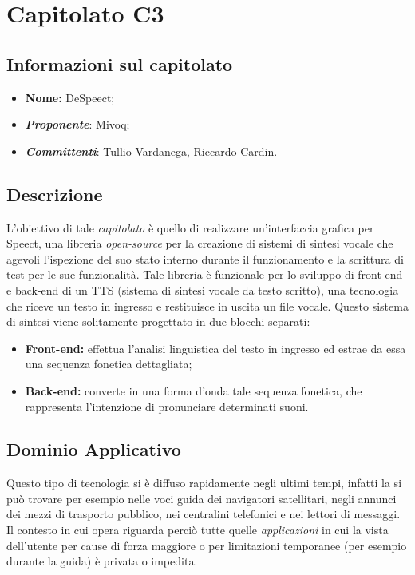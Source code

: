 \section{Capitolato C3}
\subsection{Informazioni sul capitolato}
	\begin{itemize}
		\item \textbf{Nome:}
		DeSpeect;
		\item \textbf{\textit{Proponente}}:
		Mivoq;
		\item \textbf{\textit{Committenti}}:
		Tullio Vardanega, Riccardo Cardin.
	\end{itemize}

\subsection{Descrizione}
	L'obiettivo di tale \textit{capitolato} è quello di realizzare un'interfaccia grafica per Speect, una libreria \textit{open-source} per la creazione di sistemi di sintesi vocale che agevoli l’ispezione del suo stato interno durante il funzionamento e la scrittura di test per le sue funzionalità.
	\newline \newline Tale libreria è funzionale per lo sviluppo di front-end e back-end di un TTS (sistema di sintesi vocale da testo scritto), una tecnologia che riceve un testo in ingresso e restituisce in uscita un file vocale. Questo sistema di sintesi viene solitamente progettato in due blocchi separati:
	\begin{itemize}
		\item \textbf{Front-end:}
		effettua l'analisi linguistica del testo in ingresso ed estrae da essa una sequenza fonetica dettagliata;
		\item \textbf{Back-end:}
		converte in una forma d'onda tale sequenza fonetica, che rappresenta l'intenzione di pronunciare determinati suoni.
	\end{itemize}

\subsection{Dominio Applicativo}
	 Questo tipo di tecnologia si è diffuso rapidamente negli ultimi tempi, infatti la si può trovare per esempio nelle voci guida dei navigatori satellitari, negli annunci dei mezzi di trasporto pubblico, nei centralini telefonici e nei lettori di messaggi.
	 \newline \newline Il contesto in cui opera riguarda perciò tutte quelle \textit{applicazioni} in cui la vista dell'utente per cause di forza maggiore o per limitazioni temporanee (per esempio durante la guida) è privata o impedita.

